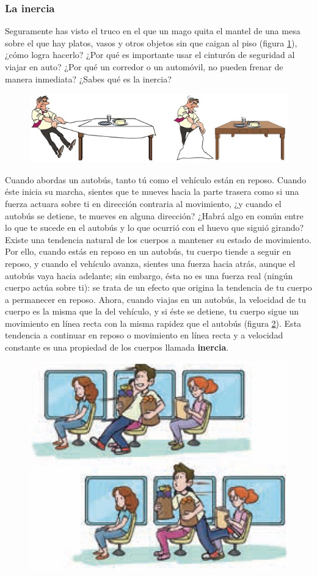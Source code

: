 \documentclass[11pt]{book}
\begin{document}
\subsubsection{La inercia}
Seguramente has visto el truco en el que un mago quita el mantel de una mesa sobre
el que hay platos, vasos y otros objetos sin que caigan al piso
(figura \ref{fig:inercia}), ¿cómo logra hacerlo? ¿Por qué es importante
usar el cinturón de seguridad al viajar en auto?
¿Por qué un corredor o un automóvil, no pueden frenar de manera inmediata?
¿Sabes qué es la inercia?
\begin{figure}[H]
    \centering
    \includegraphics[width=0.6\linewidth]{inercia.jpg}
    \label{fig:inercia}
\end{figure}
Cuando abordas un autobús, tanto tú como el vehículo están en reposo. Cuando éste inicia su marcha,
sientes que te mueves hacia la parte trasera como si una fuerza actuara sobre ti en dirección
contraria al movimiento, ¿y cuando el autobús se detiene, te mueves en alguna dirección?
¿Habrá algo en común entre lo que te sucede en el autobús y lo que ocurrió con el huevo que
siguió girando? Existe una tendencia natural de los cuerpos a mantener su estado de movimiento.
Por ello, cuando estás en reposo en un autobús, tu cuerpo tiende a seguir en reposo, y cuando
el vehículo avanza, sientes una fuerza hacia atrás, aunque el autobús vaya hacia adelante;
sin embargo, ésta no es una fuerza real (ningún cuerpo actúa sobre ti): se trata de un efecto
que origina la tendencia de tu cuerpo a permanecer en reposo. Ahora, cuando viajas en un autobús,
la velocidad de tu cuerpo es la misma que la del vehículo, y si éste se detiene, tu cuerpo
sigue un movimiento en línea recta con la misma rapidez que el autobús (figura \ref{fig:autobus}).
Esta tendencia a continuar en reposo o movimiento en línea recta y
a velocidad constante es una propiedad de los cuerpos llamada \textbf{inercia}.

\begin{figure}[H]
    \centering
    \includegraphics[width=0.4\linewidth]{autobus.jpg}
    \label{fig:autobus}
\end{figure}
\end{document}
